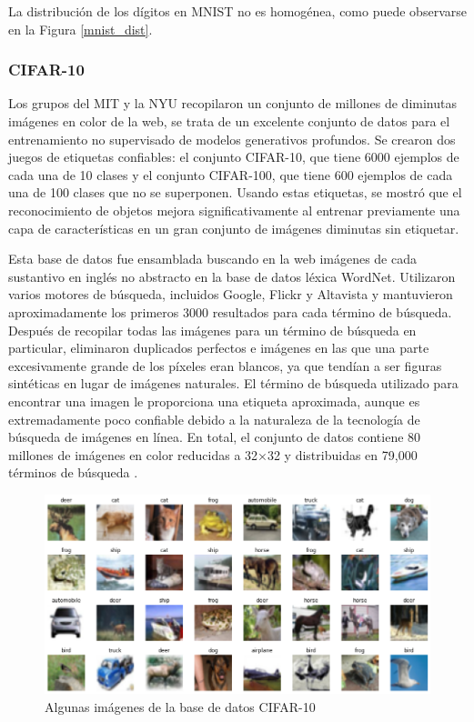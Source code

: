 La distribución de los dígitos en MNIST no es homogénea, como puede observarse en la Figura \ref{mnist_dist}.

\subsubsection{CIFAR-10}
Los grupos del MIT y la NYU recopilaron un conjunto de millones de diminutas imágenes en color de la web, se trata de un excelente conjunto de datos para el entrenamiento no supervisado de modelos generativos profundos. Se crearon dos juegos de etiquetas confiables: el conjunto CIFAR-10, que tiene 6000 ejemplos de cada una de 10 clases y el conjunto CIFAR-100, que tiene 600 ejemplos de cada una de 100 clases que no se superponen. Usando estas etiquetas, se mostró que el reconocimiento de objetos mejora significativamente al entrenar previamente una capa de características en un gran conjunto de imágenes diminutas sin etiquetar.

Esta base de datos fue ensamblada buscando en la web imágenes de cada sustantivo en inglés no abstracto en la base de datos léxica WordNet. Utilizaron varios motores de búsqueda, incluidos Google, Flickr y Altavista y mantuvieron aproximadamente los primeros 3000 resultados para cada término de búsqueda. Después de recopilar todas las imágenes para un término de búsqueda en particular, eliminaron duplicados perfectos e imágenes en las que una parte excesivamente grande de los píxeles eran blancos, ya que tendían a ser figuras sintéticas en lugar de imágenes naturales. El término de búsqueda utilizado para encontrar una imagen le proporciona una etiqueta aproximada, aunque es extremadamente poco confiable debido a la naturaleza de la tecnología de búsqueda de imágenes en línea. En total, el conjunto de datos contiene 80 millones de imágenes en color reducidas a 32×32 y distribuidas en 79,000 términos de búsqueda \cite{Krizhevsky09learningmultiple}.

\begin{figure}[h!]
    \centering
    \includegraphics[width=\textwidth]{images/cifar-10/cifar10.png}
    \caption{Algunas imágenes de la base de datos CIFAR-10}
    \label{cifar}
\end{figure}

